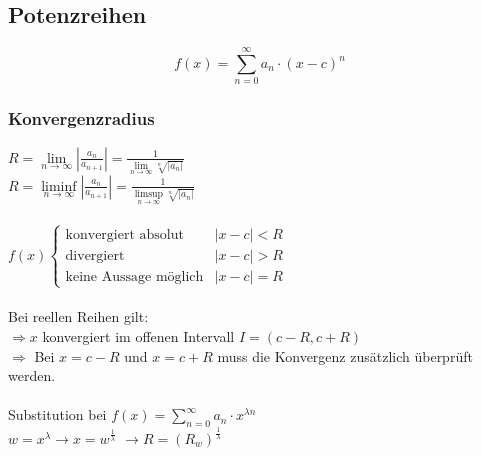 \documentclass[6pt,a4paper]{scrartcl}
\newcommand{\abs}[1]{\ensuremath{\left\vert#1\right\vert}}
\newcommand{\Ra}[0]{\ensuremath{\Rightarrow}}
\begin{document}
\begin{multicols*}{4}
\subsection{Potenzreihen} %
\begin{equation*}
f(x)=\sum_{n=0}^\infty a_n \cdot (x-c)^n
\end{equation*}
\subsubsection{Konvergenzradius}
$R = \lim\limits_{n\rightarrow \infty} \abs{\frac{a_n}{a_{n+1}}}=\frac{1}{\lim\limits_{n\rightarrow \infty}\sqrt[n]{\abs{a_n}}}$ \\
$R =\liminf\limits_{n\rightarrow \infty} \abs{\frac{a_n}{a_{n+1}}}=\frac{1}{\limsup\limits_{n\rightarrow \infty}\sqrt[n]{\abs{a_n}}}$ \\ \\
$f(x)\begin{cases} 
	\text{konvergiert absolut} & \abs{x-c} < R \\
	\text{divergiert} & \abs{x-c} > R \\
	\text{keine Aussage möglich} & \abs{x-c} = R
	\end{cases}$\\ \\
Bei reellen Reihen gilt: \\
$\Ra x$ konvergiert im offenen Intervall $I=(c-R,c+R)$ \\
$\Ra$ Bei $x=c-R$ und $x=c+R$ muss die Konvergenz zusätzlich überprüft werden.\\\\
Substitution bei $f(x)=\sum_{n=0}^\infty a_n \cdot x^{\lambda n}$ \\
$w=x^\lambda \rightarrow x=w^\frac{1}{\lambda}$
$\rightarrow R=\left(R_w\right)^\frac{1}{\lambda}$


\end{multicols*}
\end{document}
